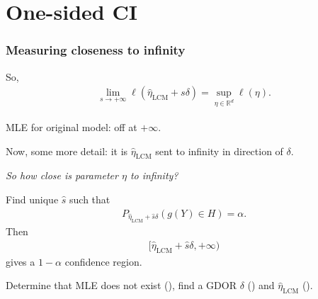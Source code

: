 \documentclass[ 10pt]{beamer}
\def\RR{{\mathbb R}}
\newcommand{\etaLCM}{\hat{\eta}_{\textrm{LCM}}}
\begin{document}
\section{One-sided CI}
\frame
{
  \frametitle{Measuring closeness to infinity}  
So,
\begin{align*}
	\lim_{s \to +\infty} \ell(\etaLCM + s\delta) = \sup_{\eta \in \RR^d} \ell(\eta).
\end{align*}	

MLE for original model: off at $+\infty$.

Now, some more detail: it is $\etaLCM$ sent to infinity in direction of $\delta$.
\vspace{2mm}


\emph{So how close is \alert{parameter} $\eta$ to infinity?  }
\vspace{2mm}

\pause
Find unique $\hat{s}$ such that
\begin{align*}
		P_{\etaLCM + \hat{s} \delta}( g(Y) \in H) = \alpha.
\end{align*}
\pause
Then
\begin{align*}
[ \etaLCM + \hat{s} \delta, + \infty)
\end{align*}
gives a $1 - \alpha$ confidence region.
\vspace{2mm}

\pause
\begin{block}{}
Determine that MLE does not exist (\checkmark), find a GDOR $\delta$ (\checkmark) and $\etaLCM$ (\checkmark).
\end{block}
}

%
%
\end{document}
